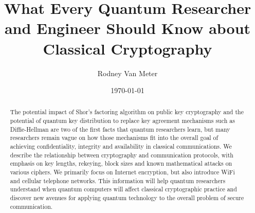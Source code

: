 \documentclass[%
 aip,
 jmp,%
 amsmath,amssymb,
 reprint,%
]{revtex4-1}
\def\comment#1{{\color{ForestGreen}$\Rightarrow${\small\em #1}}}
\begin{document}

\title[What Crypto]{What Every Quantum Researcher and Engineer Should Know about Classical Cryptography}%

\author{Rodney Van Meter}
%

\date{\today}%

\begin{abstract}
  The potential impact of Shor's factoring algorithm on public key
  cryptography and the potential of quantum key distribution to
  replace key agreement mechanisms such as Diffie-Hellman are two of
  the first facts that quantum researchers learn, but many researchers
  remain vague on how those mechanisms fit into the overall goal of
  achieving confidentiality, integrity and availability in classical
  communications.  We describe the relationship between cryptography
  and communication protocols, with emphasis on key lengths, rekeying,
  block sizes and known mathematical attacks on various ciphers.  We
  primarily focus on Internet encryption, but also introduce WiFi and
  cellular telephone networks.  This information will help quantum
  researchers understand when quantum computers will affect classical
  cryptographic practice and discover new avenues for applying quantum
  technology to the overall problem of secure communication.
%
\end{abstract}

\maketitle

\tableofcontents{}
\end{document}
